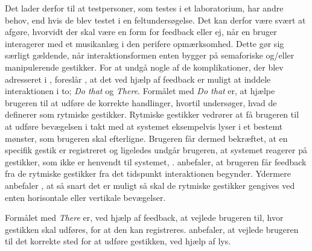 Det lader derfor til at testpersoner, som testes i et laboratorium, har andre behov, end hvis de blev testet i en feltundersøgelse. Det kan derfor være svært at afgøre, hvorvidt der skal være en form for feedback eller ej, når en bruger interagerer med et musikanlæg i den perifere opmærksomhed. Dette gør sig særligt gældende, når interaktionsformen enten bygger på semaforiske og/eller manipulerende gestikker. \blankline 
%
For at undgå nogle af de komplikationer, der blev adresseret i , foreslår \textcite{PDF:DoThatThere}, at det ved hjælp af feedback er muligt at inddele interaktionen i to; \textit{Do that} og \textit{There}. Formålet med \textit{Do that} er, at hjælpe brugeren til at udføre de korrekte handlinger, hvortil \textcite[s. 4]{PDF:DoThatThere} undersøger, hvad de definerer som rytmiske gestikker. Rytmiske gestikker vedrører at få brugeren til at udføre bevægelsen i takt med at systemet eksempelvis lyser i et bestemt mønster, som brugeren skal efterligne. Brugeren får dermed bekræftet, at en specifik gestik er registreret og ligeledes undgår brugeren, at systemet reagerer på gestikker, som ikke er henvendt til systemet, \parencite[s. 4]{PDF:DoThatThere}. \textcite[s. 10]{PDF:DoThatThere} anbefaler, at brugeren får feedback fra de rytmiske gestikker fra det tidspunkt interaktionen begynder. Ydermere anbefaler \textcite[s. 10]{PDF:DoThatThere}, at så snart det er muligt så skal de rytmiske gestikker gengives ved enten horisontale eller vertikale bevægelser. 

Formålet med \textit{There} er, ved hjælp af feedback, at vejlede brugeren til, hvor gestikken skal udføres, for at den kan registreres. \textcite[s. 10]{PDF:DoThatThere} anbefaler, at vejlede brugeren til det korrekte sted for at udføre gestikken, ved hjælp af lys. 
